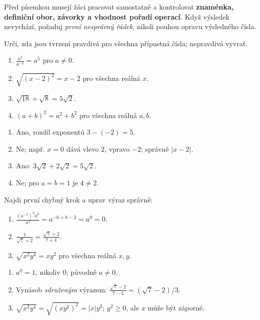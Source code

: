 \documentclass[11pt,a4paper]{article}
\begin{document}

Před písemkou musejí žáci pracovat samostatně a kontrolovat
\textbf{znaménka, definiční obor, závorky a vhodnost pořadí operací}.
Když výsledek nevychází, požaduj \emph{první nesprávný řádek}, nikoli
pouhou opravu výsledného čísla.

\begin{zadaniReseniBox}[title={Samostatná práce 1},breakable=false]
Urči, zda jsou tvrzení pravdivá pro všechna přípustná čísla; nepravdivá vyvrať.
\begin{enumerate}[label=\alph*)]
\item $\displaystyle\frac{a^3}{a^{-2}}=a^5$ pro $a\ne0$.
\item $\sqrt{(x-2)^2}=x-2$ pro všechna reálná $x$.
\item $\sqrt{18}+\sqrt8=5\sqrt2$.
\item $(a+b)^2=a^2+b^2$ pro všechna reálná $a,b$.
\end{enumerate}
\tcblower
\begin{enumerate}[label=\alph*)]
\item Ano, rozdíl exponentů $3-(-2)=5$.
\item Ne; např. $x=0$ dává vlevo $2$, vpravo $-2$; správně $|x-2|$.
\item Ano: $3\sqrt2+2\sqrt2=5\sqrt2$.
\item Ne; pro $a=b=1$ je $4\ne2$.
\end{enumerate}
\end{zadaniReseniBox}

\begin{prikladReseniBox}[title={Příklad 1},breakable=false]
Najdi první chybný krok a uprav výraz správně:
\begin{enumerate}[label=\alph*)]
\item $\displaystyle\frac{(a^{-2})^3a^8}{a^2}=a^{-6+8-2}=a^0=0$.
\item $\displaystyle\frac1{\sqrt7+2}=\frac{\sqrt7+2}{7+4}$.
\item $\sqrt{x^2y^4}=xy^2$ pro všechna reálná $x,y$.
\end{enumerate}
\tcblower
\begin{enumerate}[label=\alph*)]
\item $a^0=\boxed1$, nikoliv $0$; původně $a\ne0$.
\item Vynásob \emph{sdruženým} výrazem:
$\frac{\sqrt7-2}{7-4}=\boxed{(\sqrt7-2)/3}$.
\item $\sqrt{x^2y^4}=\sqrt{(xy^2)^2}=\boxed{|x|y^2}$;
$y^2\ge0$, ale $x$ může být záporné.
\end{enumerate}
\end{prikladReseniBox}
\end{document}
